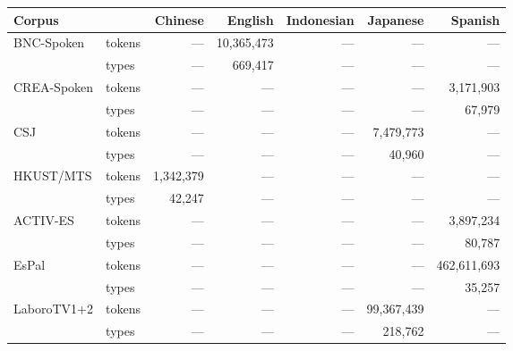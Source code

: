 \begin{tabular}{llrrrrr}
\toprule
Corpus &  & Chinese & English & Indonesian & Japanese & Spanish \\
\midrule
\multirow[c]{2}{*}{BNC-Spoken} & tokens & {---} & 10,365,473 & {---} & {---} & {---} \\
 & \cellcolor[HTML]{EEEEEE} types & \cellcolor[HTML]{EEEEEE} {---} & \cellcolor[HTML]{EEEEEE} 669,417 & \cellcolor[HTML]{EEEEEE} {---} & \cellcolor[HTML]{EEEEEE} {---} & \cellcolor[HTML]{EEEEEE} {---} \\
\multirow[c]{2}{*}{CREA-Spoken} & tokens & {---} & {---} & {---} & {---} & 3,171,903 \\
 & \cellcolor[HTML]{EEEEEE} types & \cellcolor[HTML]{EEEEEE} {---} & \cellcolor[HTML]{EEEEEE} {---} & \cellcolor[HTML]{EEEEEE} {---} & \cellcolor[HTML]{EEEEEE} {---} & \cellcolor[HTML]{EEEEEE} 67,979 \\
\multirow[c]{2}{*}{CSJ} & tokens & {---} & {---} & {---} & 7,479,773 & {---} \\
 & \cellcolor[HTML]{EEEEEE} types & \cellcolor[HTML]{EEEEEE} {---} & \cellcolor[HTML]{EEEEEE} {---} & \cellcolor[HTML]{EEEEEE} {---} & \cellcolor[HTML]{EEEEEE} 40,960 & \cellcolor[HTML]{EEEEEE} {---} \\
\multirow[c]{2}{*}{HKUST/MTS} & tokens & 1,342,379 & {---} & {---} & {---} & {---} \\
 & \cellcolor[HTML]{EEEEEE} types & \cellcolor[HTML]{EEEEEE} 42,247 & \cellcolor[HTML]{EEEEEE} {---} & \cellcolor[HTML]{EEEEEE} {---} & \cellcolor[HTML]{EEEEEE} {---} & \cellcolor[HTML]{EEEEEE} {---} \\
\multirow[c]{2}{*}{ACTIV-ES} & tokens & {---} & {---} & {---} & {---} & 3,897,234 \\
 & \cellcolor[HTML]{EEEEEE} types & \cellcolor[HTML]{EEEEEE} {---} & \cellcolor[HTML]{EEEEEE} {---} & \cellcolor[HTML]{EEEEEE} {---} & \cellcolor[HTML]{EEEEEE} {---} & \cellcolor[HTML]{EEEEEE} 80,787 \\
\multirow[c]{2}{*}{EsPal} & tokens & {---} & {---} & {---} & {---} & 462,611,693 \\
 & \cellcolor[HTML]{EEEEEE} types & \cellcolor[HTML]{EEEEEE} {---} & \cellcolor[HTML]{EEEEEE} {---} & \cellcolor[HTML]{EEEEEE} {---} & \cellcolor[HTML]{EEEEEE} {---} & \cellcolor[HTML]{EEEEEE} 35,257 \\
\multirow[c]{2}{*}{LaboroTV1+2} & tokens & {---} & {---} & {---} & 99,367,439 & {---} \\
 & \cellcolor[HTML]{EEEEEE} types & \cellcolor[HTML]{EEEEEE} {---} & \cellcolor[HTML]{EEEEEE} {---} & \cellcolor[HTML]{EEEEEE} {---} & \cellcolor[HTML]{EEEEEE} 218,762 & \cellcolor[HTML]{EEEEEE} {---} \\

\end{tabular}

